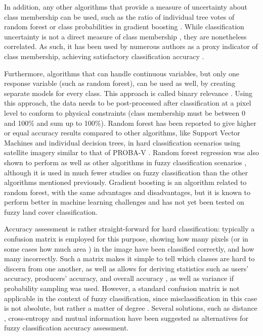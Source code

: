 \documentclass[a4paper,10pt]{article}
\begin{document}
In addition, any other algorithms that provide a measure of uncertainty about class membership can be used, such as the ratio of individual tree votes of random forest \citep{breiman2001random} or class probabilities in gradient boosting \citep{friedman2001gradientboost}. While classification uncertainty is not a direct measure of class membership \citep{sytze2000fuzzyset}, they are nonetheless correlated. As such, it has been used by numerous authors as a proxy indicator of class membership, achieving satisfactory classification accuracy \citep{foody2002accuracy}.

Furthermore, algorithms that can handle continuous variables, but only one response variable (such as random forest), can be used as well, by creating separate models for every class. This approach is called binary relevance \citep{karalas2016br}. Using this approach, the data needs to be post-processed after classification at a pixel level to conform to physical constraints (class membership must be between 0 and 100\% and sum up to 100\%). Random forest has been reported to give higher or equal accuracy results compared to other algorithms, like Support Vector Machines and individual decision trees, in hard classification scenarios using satellite imagery similar to that of PROBA-V \citep{duro2012algorithmcomparison}. Random forest regression was also shown to perform as well as other algorithms in fuzzy classification scenarios \citep{walton2008subpixelrf}, although it is used in much fewer studies on fuzzy classification than the other algorithms mentioned previously. Gradient boosting is an algorithm related to random forest, with the same advantages and disadvantages, but it is known to perform better in machine learning challenges \citep{chen2015higgs} and has not yet been tested on fuzzy land cover classification.

Accuracy assessment is rather straight-forward for hard classification: typically a confusion matrix is employed for this purpose, showing how many pixels (or in some cases how much area \citep{stehman2009sampling}) in the image have been classified correctly, and how many incorrectly. Such a matrix makes it simple to tell which classes are hard to discern from one another, as well as allows for deriving statistics such as users' accuracy, producers' accuracy, and overall accuracy \citep{foody1996fuzzyevaluation}, as well as variance if probability sampling was used. However, a standard confusion matrix is not applicable in the context of fuzzy classification, since misclassification in this case is not absolute, but rather a matter of degree \citep{foody2002accuracy}. Several solutions, such as distance \citep{foody1996fuzzyevaluation}, cross-entropy and mutual information \citep{lu2007methods} have been suggested as alternatives for fuzzy classification accuracy assessment.
\end{document}
